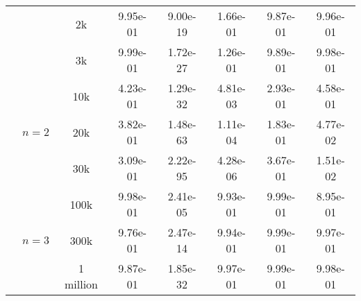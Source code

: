 \begin{table*}[t]
{\begin{tabular}{cccccccc}
        & & 2k & 9.95e-01 & \cellcolor{blue!30}9.00e-19 & 1.66e-01 & 9.87e-01 & 9.96e-01\\
        & & 3k & 9.99e-01 & \cellcolor{blue!30}1.72e-27 & 1.26e-01 & 9.89e-01 & 9.98e-01 \\
        \cmidrule{2-8}
        & \multirow{3}{*}{$n=2$} & 10k & 4.23e-01 & \cellcolor{blue!30}1.29e-32 & \cellcolor{blue!10}4.81e-03 & 2.93e-01 & 4.58e-01 \\
        & & 20k & 3.82e-01 & \cellcolor{blue!30}1.48e-63 & \cellcolor{blue!10}1.11e-04 & 1.83e-01 & 4.77e-02 \\
        & & 30k & 3.09e-01 & \cellcolor{blue!30}2.22e-95 & \cellcolor{blue!30}4.28e-06 & 3.67e-01 & 1.51e-02 \\
        \cmidrule{2-8}
        & \multirow{3}{*}{$n=3$} & 100k & 9.98e-01 & \cellcolor{blue!10}2.41e-05 & 9.93e-01 & 9.99e-01 & 8.95e-01 \\
        & & 300k & 9.76e-01 & \cellcolor{blue!30}2.47e-14 & 9.94e-01 & 9.99e-01 & 9.97e-01 \\
        & & 1 million & 9.87e-01 & \cellcolor{blue!30}1.85e-32 & 9.97e-01 & 9.99e-01 & 9.98e-01\\
        \bottomrule
    \end{tabular}
    }
    \label{tab:removal_llama3_2}
\end{table*}